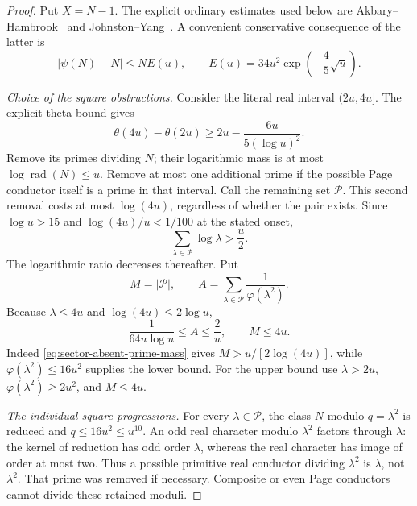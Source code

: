 \documentclass[11pt,a4paper]{article}
\theoremstyle{definition}
\theoremstyle{remark}
\begin{document}
\begin{proof}
Put $X=N-1$.  The explicit ordinary estimates used below are
Akbary--Hambrook~\cite[Lemma 3.1(d),(f)]{AH} and
Johnston--Yang~\cite[Theorem 1.1]{JY}.  A convenient conservative
consequence of the latter is
\begin{equation}
 |\psi(N)-N|\leq NE(u),\qquad
 E(u)=34u^2\exp\left(-\frac45\sqrt u\right).
 \label{eq:sector-ordinary-E}
\end{equation}

\emph{Choice of the square obstructions.}
Consider the literal real interval $(2u,4u]$.  The explicit theta
bound gives
\[
 \theta(4u)-\theta(2u)
               \geq2u-\frac{6u}{5(\log u)^2}.
\]
Remove its primes dividing $N$; their logarithmic mass is at most
$\log\operatorname{rad}(N)\leq u$.  Remove at most one additional
prime if the possible Page conductor itself is a prime in that
interval.  Call the remaining set $\mathcal P$.  This second removal
costs at most $\log(4u)$, regardless of whether the pair exists.
Since $\log u>15$ and $\log(4u)/u<1/100$ at the stated onset,
\begin{equation}
              \sum_{\lambda\in\mathcal P}\log\lambda>\frac u2.
 \label{eq:sector-absent-prime-mass}
\end{equation}
The logarithmic ratio decreases thereafter.  Put
\[
 M=|\mathcal P|,\qquad
 A=\sum_{\lambda\in\mathcal P}\frac1{\varphi(\lambda^2)}.
\]
Because $\lambda\leq4u$ and $\log(4u)\leq2\log u$,
\begin{equation}
 \frac1{64u\log u}\leq A\leq\frac2u,\qquad M\leq4u.
 \label{eq:sector-A-bounds}
\end{equation}
Indeed \eqref{eq:sector-absent-prime-mass} gives
$M>u/[2\log(4u)]$, while
$\varphi(\lambda^2)\leq16u^2$ supplies the lower bound.  For the
upper bound use $\lambda>2u$,
$\varphi(\lambda^2)\geq2u^2$, and $M\leq4u$.

\emph{The individual square progressions.}
For every $\lambda\in\mathcal P$, the class $N$ modulo
$q=\lambda^2$ is reduced and $q\leq16u^2\leq u^{10}$.
An odd real character modulo $\lambda^2$ factors through $\lambda$:
the kernel of reduction has odd order $\lambda$, whereas the real
character has image of order at most two.  Thus a possible primitive
real conductor dividing $\lambda^2$ is $\lambda$, not
$\lambda^2$.  That prime was removed if necessary.  Composite or
even Page conductors cannot divide these retained moduli.


\end{proof}
\end{document}
